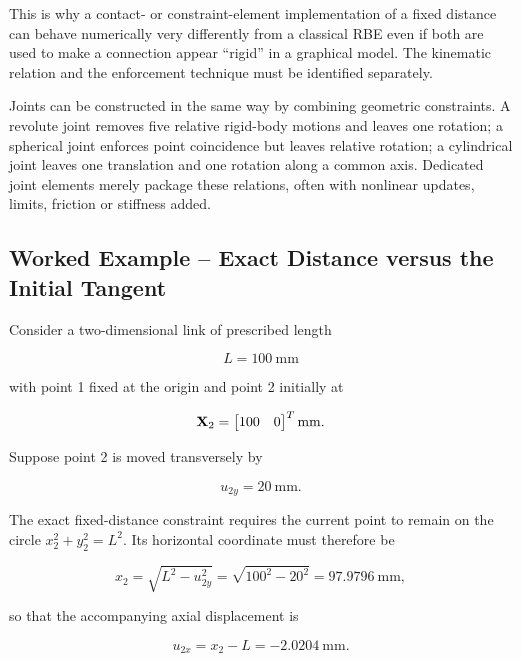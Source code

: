 This is why a contact- or constraint-element implementation of a fixed distance
can behave numerically very differently from a classical RBE even if both are
used to make a connection appear ``rigid'' in a graphical model. The kinematic
relation and the enforcement technique must be identified separately.

Joints can be constructed in the same way by combining geometric constraints.
A revolute joint removes five relative rigid-body motions and leaves one rotation;
a spherical joint enforces point coincidence but leaves relative rotation; a
cylindrical joint leaves one translation and one rotation along a common axis.
Dedicated joint elements merely package these relations, often with nonlinear
updates, limits, friction or stiffness added.

\subsection{Worked Example -- Exact Distance versus the Initial Tangent}

Consider a two-dimensional link of prescribed length

\begin{equation}
    L=100~\mathrm{mm}
\end{equation}

with point 1 fixed at the origin and point 2 initially at

\begin{equation}
    \mathbf{X}_2=
    \begin{bmatrix}
        100 & 0
    \end{bmatrix}^{T}\mathrm{mm}.
\end{equation}

Suppose point 2 is moved transversely by

\begin{equation}
    u_{2y}=20~\mathrm{mm}.
\end{equation}

The exact fixed-distance constraint requires the current point to remain on the
circle $x_2^2+y_2^2=L^2$. Its horizontal coordinate must therefore be

\begin{equation}
    x_2=\sqrt{L^2-u_{2y}^2}
       =\sqrt{100^2-20^2}
       =97.9796~\mathrm{mm},
\end{equation}

so that the accompanying axial displacement is

\begin{equation}
    \boxed{u_{2x}=x_2-L=-2.0204~\mathrm{mm}}.
\end{equation}


